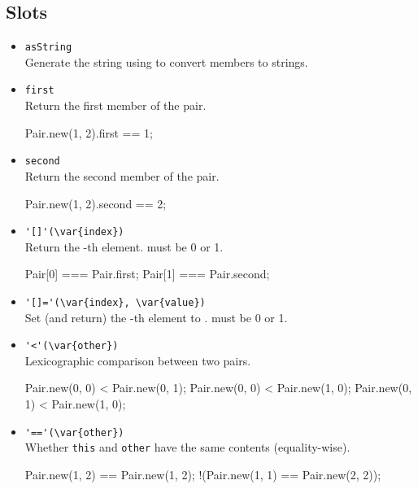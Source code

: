 \subsection{Slots}
\begin{itemize}
\item \lstinline|asString|\\
  Generate the string  using
   to convert members to strings.

\item \lstinline|first|\\
  Return the first member of the pair.
\begin{urbiassert}[firstnumber=last]
Pair.new(1, 2).first == 1;
\end{urbiassert}

\item \lstinline|second|\\
  Return the second member of the pair.
\begin{urbiassert}[firstnumber=last]
Pair.new(1, 2).second == 2;
\end{urbiassert}

\item \lstinline|'[]'(\var{index})|\\
  Return the -th element.   must be 0 or 1.
\begin{urbiassert}[firstnumber=last]
Pair[0] === Pair.first;
Pair[1] === Pair.second;
\end{urbiassert}

\item \lstinline|'[]='(\var{index}, \var{value})|\\
  Set (and return) the -th element to .
   must be 0 or 1.

\item \lstinline|'<'(\var{other})|\\
  Lexicographic comparison between two pairs.
\begin{urbiassert}[firstnumber=last]
Pair.new(0, 0) < Pair.new(0, 1);
Pair.new(0, 0) < Pair.new(1, 0);
Pair.new(0, 1) < Pair.new(1, 0);
\end{urbiassert}

\item \lstinline|'=='(\var{other})|\\
  Whether \lstinline|this| and \lstinline|other| have the same
  contents (equality-wise).
\begin{urbiassert}[firstnumber=last]
Pair.new(1, 2) == Pair.new(1, 2);
!(Pair.new(1, 1) == Pair.new(2, 2));
\end{urbiassert}
\end{itemize}



